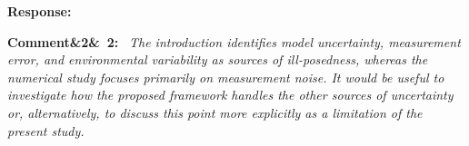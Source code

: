 \documentclass[11pt]{article}
\newenvironment{rcomment}[1]{\par\bigskip\noindent\textbf{Comment\ifx&#1&\else\ #1\fi:}\ \itshape}{\par}
\newenvironment{response}{\par\smallskip\noindent\color{resp}\textbf{Response:}\ }{\par}
\newenvironment{action}{\par\smallskip\noindent\color{resp}\textbf{Action:}\ }{\par}
\newcommand{\tbd}[1]{\textcolor{note}{\textsf{[#1]}}}
\newcommand{\lines}[1]{\tbd{lines #1}}
\begin{document}
\begin{response}
%
%

\end{response}

\begin{rcomment}{2}
The introduction identifies model uncertainty, measurement error, and environmental variability as sources of
ill-posedness, whereas the numerical study focuses primarily on measurement noise. It would be useful to investigate how
the proposed framework handles the other sources of uncertainty or, alternatively, to discuss this point more explicitly
as a limitation of the present study.
\end{rcomment}
\end{document}
